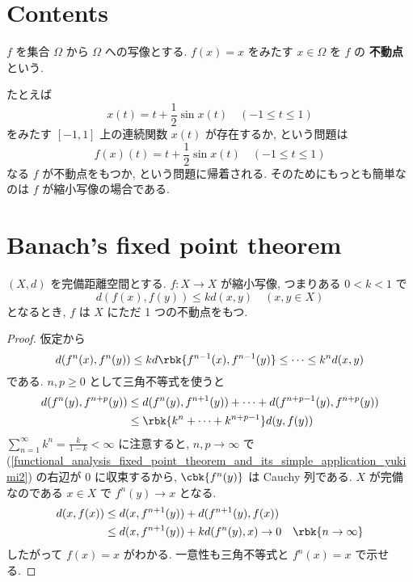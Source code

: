 \documentclass[openany, a4paper, oneside]{jsbook}
\begin{document}
\section{Contents}

\begin{defn}
 $f$ を集合 $\Omega$ から $\Omega$ への写像とする.
 $f (x)=x$ をみたす $x \in \Omega$ を $f$ の \textbf{不動点} という.
\end{defn}

たとえば
\begin{equation}
 x (t)
 =
 t + \frac{1}{2} \sin x (t) \quad (-1 \le t \le 1)
\end{equation}
をみたす $[-1, 1]$ 上の連続関数  $x (t)$  が存在するか, という問題は
\begin{equation}
 f (x) (t)
 =
 t + \frac{1}{2} \sin x (t) \quad  (-1 \le t \le 1)
\end{equation}
なる $f$ が不動点をもつか, という問題に帰着される.
そのためにもっとも簡単なのは $f$ が縮小写像の場合である.
\section{Banach's fixed point theorem}

\begin{thm}
 $(X, d)$ を完備距離空間とする.
 $f \colon X \to X$ が縮小写像, つまりある $0 < k <1$ で
 \begin{equation}
  d (f (x), f (y))
  \le
  kd (x, y) \quad  (x, y \in X)
 \end{equation}
 となるとき, $f$ は $X$ にただ 1 つの不動点をもつ.
\end{thm}
\begin{proof}
仮定から
\begin{equation}
 d (f^n (x), f^n (y))
 \le
 kd \rbk{f^{n-1}(x), f^{n-1}(y)}
 \le
 \cdots
 \le
 k^nd (x, y)
\end{equation}
である.
$n, p \ge 0$ として三角不等式を使うと
\begin{align}\label{functional_analysis_fixed_point_theorem_and_its_simple_application_yukimi2}
 d (f^n (y), f^{n+p}(y))
 &\le d (f^n (y), f^{n+1}(y)) + \cdots
  +d (f^{n+p-1}(y), f^{n+p}(y))  \\
 &\le
 \rbk{k^n + \cdots + k^{n+p-1}} d (y, f (y))
\end{align}
$\sum_{n=1}^{\infty} k^n = \frac{k}{1-k} < \infty$ に注意すると,
$n, p \to \infty$ で (\ref{functional_analysis_fixed_point_theorem_and_its_simple_application_yukimi2}) の右辺が $0$ に収束するから,
$\cbk{f^n (y)}$ は Cauchy 列である.
$X$ が完備なのである $x \in X$ で $f^n (y) \to x$ となる.
\begin{align}
 d(x, f (x))
 &\le
 d (x, f^{n+1}(y)) + d (f^{n+1}(y), f (x))  \\
 &\le
 d (x, f^{n+1}(y)) + kd (f^n (y), x) \to 0 \quad \rbk{n \to \infty}
\end{align}
したがって $f (x) = x$ がわかる.
一意性も三角不等式と $f^n (x) = x$ で示せる.
\end{proof}
\end{document}
